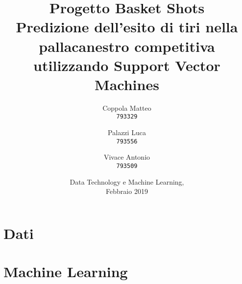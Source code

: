 \documentclass[12pt,a4paper]{report}
\begin{document}
\title{%
  \Huge Progetto Basket Shots\\
  \large Predizione dell'esito di tiri nella pallacanestro competitiva utilizzando Support Vector Machines\\
    }
\author{
  Coppola Matteo\\
  \texttt{793329}
  \and
  Palazzi Luca\\
  \texttt{793556}
   \and
  Vivace Antonio\\
  \texttt{793509}
}
\date{Data Technology e Machine Learning, \\ Febbraio 2019}
\maketitle

\tableofcontents


\chapter{Dati}



\chapter{Machine Learning}





\end{document}
